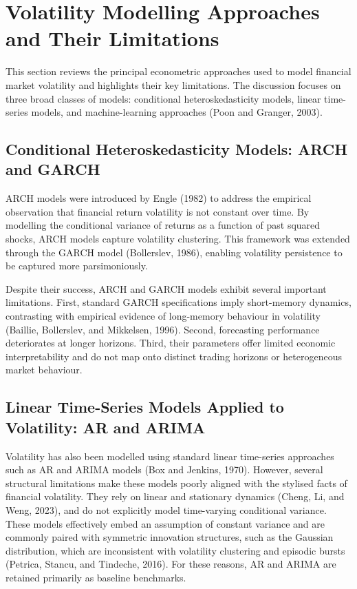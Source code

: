 \documentclass[12pt,a4paper]{report}
\begin{document}
\section{Volatility Modelling Approaches and Their Limitations}
This section reviews the principal econometric approaches used to model financial market volatility and highlights their key limitations. The discussion focuses on three broad classes of models: conditional heteroskedasticity models, linear time-series models, and machine-learning approaches (Poon and Granger, 2003).

\subsection{Conditional Heteroskedasticity Models: ARCH and GARCH}
ARCH models were introduced by Engle (1982) to address the empirical observation that financial return volatility is not constant over time. By modelling the conditional variance of returns as a function of past squared shocks, ARCH models capture volatility clustering. This framework was extended through the GARCH model (Bollerslev, 1986), enabling volatility persistence to be captured more parsimoniously.

Despite their success, ARCH and GARCH models exhibit several important limitations. First, standard GARCH specifications imply short-memory dynamics, contrasting with empirical evidence of long-memory behaviour in volatility (Baillie, Bollerslev, and Mikkelsen, 1996). Second, forecasting performance deteriorates at longer horizons. Third, their parameters offer limited economic interpretability and do not map onto distinct trading horizons or heterogeneous market behaviour.

\subsection{Linear Time-Series Models Applied to Volatility: AR and ARIMA}
Volatility has also been modelled using standard linear time-series approaches such as AR and ARIMA models (Box and Jenkins, 1970). However, several structural limitations make these models poorly aligned with the stylised facts of financial volatility. They rely on linear and stationary dynamics (Cheng, Li, and Weng, 2023), and do not explicitly model time-varying conditional variance. These models effectively embed an assumption of constant variance and are commonly paired with symmetric innovation structures, such as the Gaussian distribution, which are inconsistent with volatility clustering and episodic bursts (Petrica, Stancu, and Tindeche, 2016). For these reasons, AR and ARIMA are retained primarily as baseline benchmarks.
\end{document}
